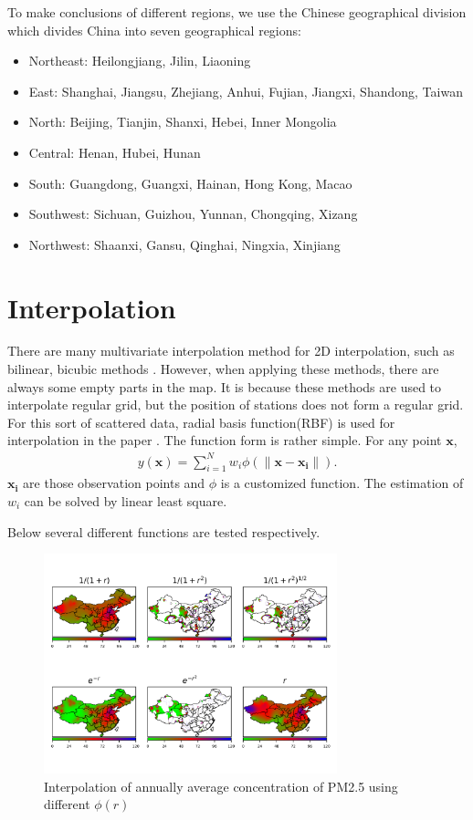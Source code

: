 \documentclass[letterpaper]{article}
\begin{document}
\begin{CJK*}{UTF8}{gkai}
To make conclusions of different regions, we use the Chinese geographical division which divides China into seven geographical regions:
\begin{itemize}
\item Northeast: Heilongjiang, Jilin, Liaoning
\item East: Shanghai, Jiangsu, Zhejiang, Anhui, Fujian, Jiangxi, Shandong, Taiwan
\item North: Beijing, Tianjin, Shanxi, Hebei, Inner Mongolia
\item Central: Henan, Hubei, Hunan
\item South: Guangdong, Guangxi, Hainan, Hong Kong, Macao
\item Southwest: Sichuan, Guizhou, Yunnan, Chongqing, Xizang
\item Northwest: Shaanxi, Gansu, Qinghai, Ningxia, Xinjiang
\end{itemize}

\section{Interpolation}

There are many multivariate interpolation method for 2D interpolation, such as bilinear, bicubic methods . However, when applying these methods, there are always some empty parts in the map. It is because these methods are used to interpolate regular grid, but the position of stations does not form a regular grid. For this sort of scattered data, radial basis function(RBF) is used for interpolation in the paper . The function form is rather simple. For any point $\mathbf{x}$,
\begin{eqnarray}
  y(\mathbf{x}) = \sum_{i=1}^Nw_i\phi\left(\|\mathbf{x} - \mathbf{x_i}\|\right).
\end{eqnarray}
$\mathbf{x_i}$ are those observation points and $\phi$ is a customized function. The estimation of $w_i$ can be solved by linear least square.

Below several different functions are tested respectively.

\begin{figure}[h]
  \includegraphics[width = 8.5cm]{Interpolation_from_20150102_to_20151231.png}
  \caption{Interpolation of annually average concentration of PM2.5 using different
    $\phi(r)$}
  \label{figure:0}
  \centering
\end{figure}


\end{CJK*}
\end{document}
